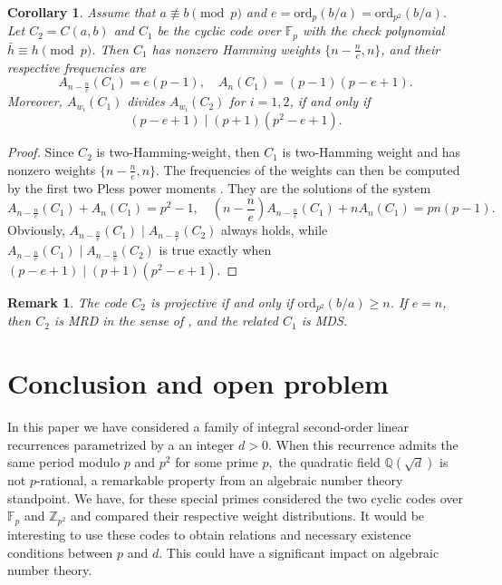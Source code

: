 \documentclass[12pt,reqno]{amsart}
\newtheorem{rem}{Remark}
\newtheorem{coro}{Corollary}
\newcommand{\F}{\mathbb{F}}
\newcommand{\Z}{\mathbb{Z}}
\newcommand{\Q}{\mathbb{Q}}
\begin{document}
\begin{coro}
	Assume that $a \not\equiv b \pmod{p}$ and $e = \mathrm{ord}_p (b/a) = \mathrm{ord}_{p^2} (b/a)$.
	Let $C_2 = C(a,b)$ and $C_1$ be the cyclic code over $\mathbb{F}_p$ with the check polynomial $\bar{h} \equiv h \pmod{p}$.
	Then $C_1$ has nonzero Hamming weights $\{n - \frac{n}{e}, n\}$, and their respective frequencies are
	\[ A_{n-\frac{n}{e}}(C_1) = e(p - 1), \quad A_n(C_1) = (p - 1)(p - e + 1). \]
	Moreover, $A_{w_i}(C_1)$ divides $A_{w_i}(C_2)$ for $i=1,2$, if and only if
	\[ (p-e+1) \mid (p+1)(p^2 - e + 1). \]
\end{coro}
\begin{proof}
	Since $C_2$ is two-Hamming-weight, then $C_1$ is two-Hamming weight and has nonzero weights $\{n - \frac{n}{e}, n\}$.
	The frequencies	of the weights can then be computed by the first two Pless power moments \cite[\S 7.3]{HuffmanPless}.
	They are the solutions of the system
	\[
	A_{n-\frac{n}{e}}(C_1) + A_n(C_1) = p^2 - 1, \quad
	\left( n - \frac{n}{e} \right) A_{n-\frac{n}{e}}(C_1) + n A_n(C_1) = pn(p-1).
	\]
	Obviously, $A_{n-\frac{n}{e}}(C_1) \mid A_{n-\frac{n}{e}}(C_2)$ always holds, while $A_{n-\frac{n}{e}}(C_1) \mid A_{n-\frac{n}{e}}(C_2)$ is true exactly when $(p-e+1) \mid (p+1)(p^2 - e + 1)$.
\end{proof}

\begin{rem}{\rm
	The code $C_2$ is projective if and only if $\mathrm{ord}_{p^2} (b/a) \geqslant n$.
	If $e = n$, then $C_2$ is MRD in the sense of \cite[Chap. 12]{SAS}, and the related $C_1$ is MDS.
}
\end{rem}


\section{Conclusion and open problem}
In this paper we have considered a family of integral second-order linear recurrences parametrized by a an integer $d>0.$
When this recurrence admits the same period modulo $p$ and $p^2$ for some prime $p,$ the quadratic field $\Q(\sqrt{d})$
is not $p$-rational, a remarkable property from an algebraic number theory standpoint. We have, for these special primes
considered the two cyclic codes over $\F_p$ and $\Z_{p^2}$
and compared their respective weight distributions. It would be interesting to use these codes to obtain relations and necessary existence conditions between $p$ and $d.$ This could have a significant impact on algebraic number theory.\\
\end{document}
